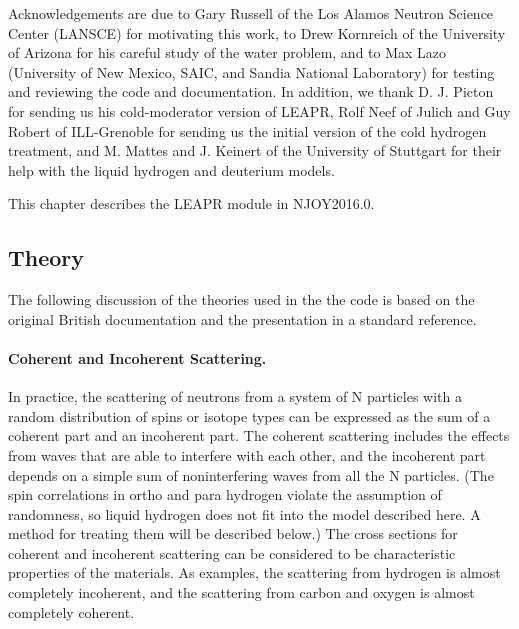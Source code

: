 Acknowledgements are due to Gary Russell of the
Los Alamos Neutron Science Center (LANSCE) for motivating this
work, to Drew Kornreich of the University of Arizona
for his careful study of the water problem, and to Max Lazo
(University of New Mexico, SAIC, and Sandia National Laboratory) for
testing and reviewing the code and documentation.  In addition, we
thank D. J. Picton for sending us his cold-moderator
version of LEAPR, Rolf Neef of Julich and Guy
Robert of ILL-Grenoble for sending us the initial
version of the cold hydrogen treatment, and M. Mattes
and J. Keinert of the University of Stuttgart for their
help with the liquid hydrogen and deuterium models.

This chapter describes the LEAPR module in NJOY2016.0.

\subsection{Theory}
\label{ssLEAPR_theory}

The following discussion of the theories used in the the code is based
on the original British documentation and the presentation in a standard
reference\cite{Parks}.


\paragraph{Coherent and Incoherent Scattering.}
In practice, the scattering of neutrons from a system of N particles
with a random distribution of spins or isotope types can be expressed
as the sum of a coherent part and an incoherent part.  The coherent
scattering includes the effects from waves that are able to interfere
with each other, and the incoherent part depends on a simple sum of
noninterfering waves from all the N particles.  (The spin correlations
in ortho and para hydrogen violate the assumption of randomness, so
liquid hydrogen does not fit into the model
described here.  A method for treating them will be described below.)
The cross sections for coherent and incoherent scattering can be
considered to be characteristic properties of the materials.
  As examples,
the scattering from hydrogen is almost completely incoherent, and the
scattering from carbon and oxygen is almost completely coherent.

